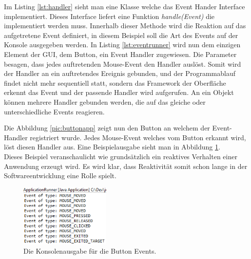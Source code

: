 Im Listing \ref{lst:handler} sieht man eine Klasse welche das Event Hander Interface implementiert. Dieses Interface liefert eine Funktion \textit{handle(Event)} die implementiert werden muss. Innerhalb dieser Methode wird die Reaktion auf das aufgetretene Event definiert, in diesem Beispiel soll die Art des Events auf der Konsole ausgegeben werden. In Listing \ref{lst:eventrunner} wird nun dem einzigen Element der GUI, dem Button, ein Event Handler zugewiesen. Die Parameter besagen, dass jedes auftretenden Mouse-Event den Handler auslöst. Somit wird der Handler an ein auftretendes Ereignis gebunden, und der Programmablauf findet nicht mehr sequentiell statt, sondern das Framework der Oberfläche erkennt das Event und der passende Handler wird aufgerufen. An ein Objekt können mehrere Handler gebunden werden, die auf das gleiche oder unterschiedliche Events reagieren.

Die Abbildung \ref{pic:buttonapp} zeigt nun den Button an welchem der Event-Handler registriert wurde. Jedes Mouse-Event welches vom Button erkannt wird, löst diesen Handler aus. Eine Beispielausgabe sieht man in Abbildung \ref{pic:consoleoutput}. \\ Dieses Beispiel veranschaulicht wie grundsätzlich ein reaktives Verhalten einer Anwendung erzeugt wird. Es wird klar, dass Reaktivität somit schon lange in der Softwareentwicklung eine Rolle spielt.
\begin{figure}[htb]
	\centering
	\includegraphics[width=0.4\textwidth]{Abb/consoleoutput.PNG}
	\caption{Die Konsolenausgabe für die Button Events.}
	\label{pic:consoleoutput}
\end{figure}
